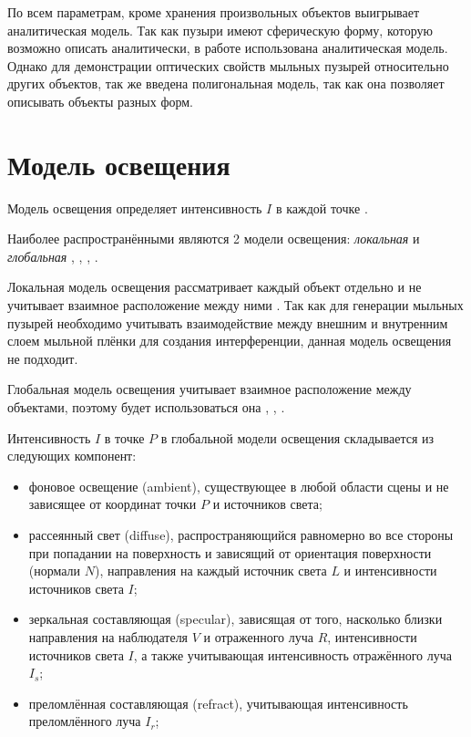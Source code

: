 По всем параметрам, кроме хранения произвольных объектов выигрывает аналитическая модель. Так как пузыри имеют сферическую форму, которую возможно описать аналитически, в работе использована аналитическая модель. Однако для демонстрации оптических свойств мыльных пузырей относительно других объектов, так же введена полигональная модель, так как она позволяет описывать объекты разных форм.

\section{Модель освещения}

Модель освещения определяет интенсивность $I$ в каждой точке \cite{жаксылык2021применение}.

Наиболее распространёнными являются 2 модели освещения: \textit{локальная} и \textit{глобальная} \cite{будак2023сравнительный}, \cite{жаксылык2021применение}, \cite{боголепов2012система}, \cite{tomsk_2011}.

Локальная модель освещения рассматривает каждый объект отдельно и не учитывает взаимное расположение между ними \cite{жаксылык2021применение}. Так как для генерации мыльных пузырей необходимо учитывать взаимодействие между внешним и внутренним слоем мыльной плёнки для создания интерференции, данная модель освещения не подходит.

Глобальная модель освещения учитывает взаимное расположение между объектами, поэтому будет использоваться она \cite{будак2023сравнительный}, \cite{боголепов2012система}, \cite{tomsk_2011}.

Интенсивность $I$ в точке $P$ в глобальной модели освещения складывается из следующих компонент:

\begin{itemize}[label=---]
	\item фоновое освещение (ambient), существующее в любой области сцены и не зависящее от координат точки $P$ и источников света;
	\item рассеянный свет (diffuse), распространяющийся равномерно во все стороны при попадании на поверхность и зависящий от ориентация поверхности (нормали $N$), направления на каждый источник света $L$ и интенсивности источников света $I$;
	\item зеркальная составляющая (specular), зависящая от того, насколько близки направления на наблюдателя $V$ и отраженного луча $R$, интенсивности источников света $I$, а также учитывающая интенсивность отражённого луча $I_s$;
    \item преломлённая составляющая (refract), учитывающая интенсивность преломлённого луча $I_r$;
\end{itemize}

